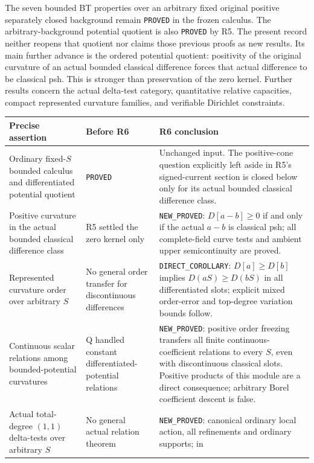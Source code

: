 \documentclass[11pt,a4paper]{article}
\numberwithin{equation}{section}
\theoremstyle{definition}
\theoremstyle{remark}
\begin{document}
The seven bounded BT properties over an arbitrary fixed original
positive separately closed background remain \texttt{PROVED} in
the frozen calculus. The arbitrary-background potential quotient
is also \texttt{PROVED} by R5. The present record neither reopens
that quotient nor claims those previous proofs as new results.
Its main further advance is the ordered potential quotient: positivity
of the original curvature of an actual bounded classical difference
forces that actual difference to be classical psh. This is stronger
than preservation of the zero kernel. Further results concern the
actual delta-test category, quantitative relative capacities, compact
represented curvature families, and verifiable Dirichlet constraints.

\begingroup
\setlength{\tabcolsep}{3pt}
\begin{longtable}{@{}p{}p{}p{}@{}}
\toprule
Precise assertion & Before R6 & R6 conclusion\\
\midrule
\endhead
Ordinary fixed-$S$ bounded calculus and differentiated potential
quotient & \texttt{PROVED} & Unchanged input. The positive-cone
question explicitly left aside in R5's signed-current section is
closed below only for its actual bounded classical difference class.\\[4pt]
Positive curvature in the actual bounded classical difference class &
R5 settled the zero kernel only & \texttt{NEW\_PROVED}: $D[a-b]\ge0$
if and only if the actual $a-b$ is classical psh; all complete-field
curve tests and ambient upper semicontinuity are proved.\\[4pt]
Represented curvature order over arbitrary $S$ & No general order
transfer for discontinuous differences & \texttt{DIRECT\_COROLLARY}:
$D[a]\ge D[b]$ implies $D(aS)\ge D(bS)$ in all differentiated slots;
explicit mixed order-error and top-degree variation bounds follow.\\[4pt]
Continuous scalar relations among bounded-potential curvatures &
Q handled constant differentiated-potential relations &
\texttt{NEW\_PROVED}: positive order freezing transfers all finite
continuous-coefficient relations to every $S$, even with discontinuous
classical slots. Positive products of this module are a direct
consequence; arbitrary Borel coefficient descent is false.\\[4pt]
Actual total-degree $(1,1)$ delta-tests over arbitrary $S$ & No
general actual relation theorem & \texttt{NEW\_PROVED}: canonical
ordinary local action, all refinements and ordinary supports; in

\end{longtable}
\end{document}
